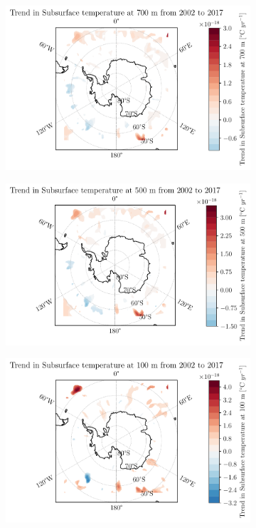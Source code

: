 \documentclass[../main.tex]{subfiles}
\begin{document}
\begin{figure}[!hbt]
    \begin{subfigure}[b]{0.3\textwidth}
    \includegraphics[width=\textwidth]{images/2021w5/chapter7/hres/trend_spatial_subsurtemp_700}
    \end{subfigure}
    \begin{subfigure}[b]{0.3\textwidth}
    \includegraphics[width=\textwidth]{images/2021w5/chapter7/hres/trend_spatial_subsurtemp_500}
    \end{subfigure}
    \begin{subfigure}[b]{0.3\textwidth}
    \includegraphics[width=\textwidth]{images/2021w5/chapter7/hres/trend_spatial_subsurtemp_100}

\end{subfigure}
\end{figure}
\end{document}
